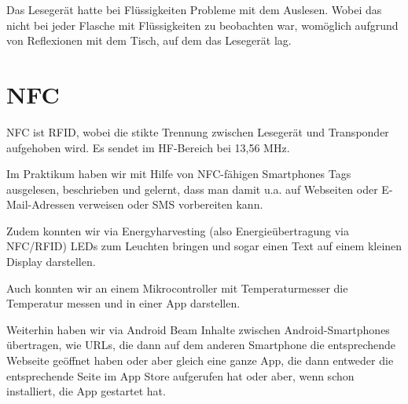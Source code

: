 \documentclass[paper=a4,fontsize=11pt,headsepline,footsepline,parskip=half]{scrartcl}
\begin{document}
Das Lesegerät hatte bei Flüssigkeiten Probleme mit dem Auslesen. Wobei das nicht bei jeder Flasche mit Flüssigkeiten zu beobachten war, womöglich
aufgrund von Reflexionen mit dem Tisch, auf dem das Lesegerät lag.

\section{NFC}

NFC ist RFID, wobei die stikte Trennung zwischen Lesegerät und Transponder aufgehoben wird. Es sendet im HF-Bereich bei 13,56 MHz.

Im Praktikum haben wir mit Hilfe von NFC-fähigen Smartphones Tags ausgelesen, beschrieben und gelernt, dass man damit u.a.
auf Webseiten oder E-Mail-Adressen verweisen oder SMS vorbereiten kann.

Zudem konnten wir via Energyharvesting (also Energieübertragung via NFC/RFID) LEDs zum Leuchten bringen und sogar einen Text auf einem kleinen
Display darstellen.

Auch konnten wir an einem Mikrocontroller mit Temperaturmesser die Temperatur messen und in einer App darstellen.

Weiterhin haben wir via Android Beam Inhalte zwischen Android-Smartphones übertragen, wie URLs, die dann auf dem anderen Smartphone die
entsprechende Webseite geöffnet haben oder aber gleich eine ganze App, die dann entweder die entsprechende Seite im App Store aufgerufen hat oder
aber, wenn schon installiert, die App gestartet hat.
\end{document}
